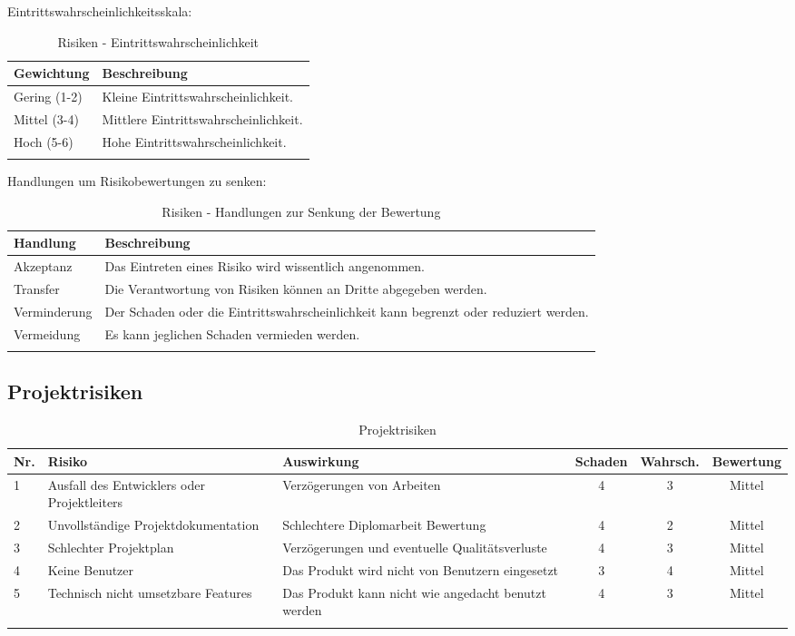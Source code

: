 \noindent
Eintrittswahrscheinlichkeitsskala:

\begin{longtable}[]{@{}lp{12cm}@{}}
  \toprule
  \textbf{Gewichtung} & \textbf{Beschreibung}\tabularnewline
  \midrule
  \endhead
  Gering (1-2)        & Kleine Eintrittswahrscheinlichkeit.\tabularnewline
  Mittel (3-4)        & Mittlere Eintrittswahrscheinlichkeit.\tabularnewline
  Hoch (5-6)          & Hohe Eintrittswahrscheinlichkeit.\tabularnewline
  \bottomrule
  \caption{Risiken - Eintrittswahrscheinlichkeit}
\end{longtable}

\noindent
Handlungen um Risikobewertungen zu senken:

\begin{longtable}[]{@{}lp{12cm}@{}}
  \toprule
  \textbf{Handlung} & \textbf{Beschreibung}\tabularnewline
  \midrule
  \endhead
  Akzeptanz         & Das Eintreten eines Risiko wird wissentlich angenommen.\tabularnewline
  Transfer          & Die Verantwortung von Risiken können an Dritte abgegeben werden.\tabularnewline
  Verminderung      & Der Schaden oder die Eintrittswahrscheinlichkeit kann begrenzt oder reduziert werden.\tabularnewline
  Vermeidung        & Es kann jeglichen Schaden vermieden werden.\tabularnewline
  \bottomrule
  \caption{Risiken - Handlungen zur Senkung der Bewertung}
\end{longtable}


\clearpage
\subsection{Projektrisiken}\label{projektrisiken}

\begin{longtable}[]{@{}lp{3cm}p{4cm}ccc@{}}
  \toprule
  \textbf{Nr.} & \textbf{Risiko}                             & \textbf{Auswirkung}                                 & \textbf{Schaden} & \textbf{Wahrsch.} & \textbf{Bewertung}\tabularnewline
  \midrule
  \endhead
  1            & Ausfall des Entwicklers oder Projektleiters & Verzögerungen von Arbeiten                          & 4                & 3                 & Mittel\tabularnewline
  2            & Unvollständige Projektdokumentation         & Schlechtere Diplomarbeit Bewertung                  & 4                & 2                 & Mittel\tabularnewline
  3            & Schlechter Projektplan                      & Verzögerungen und eventuelle Qualitätsverluste      & 4                & 3                 & Mittel\tabularnewline
  4            & Keine Benutzer                              & Das Produkt wird nicht von Benutzern eingesetzt     & 3                & 4                 & Mittel\tabularnewline
  5            & Technisch nicht umsetzbare Features         & Das Produkt kann nicht wie angedacht benutzt werden & 4                & 3                 & Mittel\tabularnewline
  \bottomrule
  \caption{Projektrisiken}
\end{longtable}

